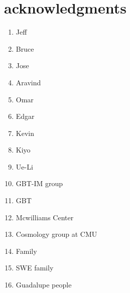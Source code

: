 \section*{acknowledgments}

\begin{enumerate}

\item Jeff
\item Bruce
\item Jose
\item Aravind
\item Omar
\item Edgar
\item Kevin 
\item Kiyo
\item Ue-Li
\item GBT-IM group
\item GBT
\item Mcwilliams Center
\item Cosmology group at CMU
\item Family
\item SWE family 
\item Guadalupe people

\end{enumerate}


